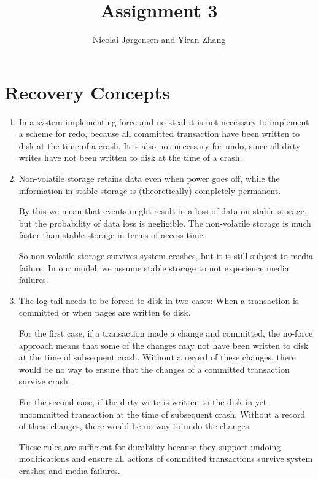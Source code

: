 \documentclass[11pt]{article}
\title          {Assignment 3}
\author         {Nicolai Jørgensen and Yiran Zhang}
\begin{document}
\maketitle
\newpage

\section{Recovery Concepts}
\begin{enumerate}
	\item
    In a system implementing force and no-steal it is not necessary to implement
    a scheme for redo, because all committed transaction have been
    written to disk at the time of a crash. It is also not
    necessary for undo, since all dirty writes have not been written to disk at
    the time of a crash.
	\item
    Non-volatile storage retains data even when power goes off, while the
    information in stable storage is (theoretically) completely permanent.
    
    By this we mean that events might result in a loss of data on stable
    storage, but the probability of data loss is negligible. The non-volatile
    storage is much faster than stable storage in terms of access time.
    
    So non-volatile storage survives system crashes, but it is still subject to
    media failure. In our model, we assume stable storage to not experience
    media failures.
	\item
    The log tail needs to be forced to disk in two cases: When a transaction is
    committed or when pages are written to disk.

    For the first case, if a transaction made a change and committed, the
    no-force approach means that some of the changes may not have been written
    to disk at the time of subsequent crash. Without a record of these changes,
    there would be no way to ensure that the changes of a committed transaction
    survive crash.

    For the second case, if the dirty write is written to the disk in yet
    uncommitted transaction at the time of subsequent crash, Without a record
    of these changes, there would be no way to undo the changes.

    These rules are sufficient for durability because they support undoing
    modifications and ensure all actions of committed transactions survive
    system crashes and media failures.
\end{enumerate}
\end{document}
